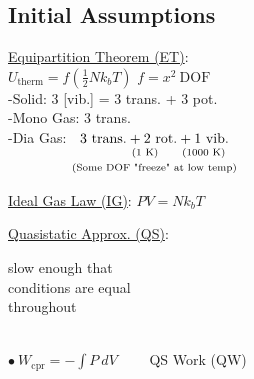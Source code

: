 \documentclass[12pt]{article}
\begin{document}
\subsection{Initial Assumptions}
\noindent
\begin{minipage}[t]{.49\textwidth}
    \underline{Equipartition Theorem (ET)}: \\[10pt]
    \(\boxed{ U_\text{therm} = f \left( \tfrac{1}{2} N k_b T \right) }\) 
        \hspace{20pt}\(\scriptstyle f = x^2\ \text{DOF}\) \\[10pt]
    -Solid: 3 [vib.] = 3 trans. + 3 pot. \\
    -Mono Gas: 3 trans.\\
    -Dia Gas: \(\begin{gathered}[t]
            \begin{aligned}[t]
                    &\text{3 trans.} + \text{2 rot.} + \text{1 vib.}\\[-6pt]
                    &\hspace{37pt} \text{\scriptsize(1 K)} \hspace{17pt} \text{\scriptsize(1000 K)} 
                \end{aligned}\\[-5pt]
            \text{\scriptsize(Some DOF "freeze" at low temp)}
        \end{gathered}\)
\end{minipage}
\begin{minipage}[t]{.49\textwidth}
    \underline{Ideal Gas Law (IG)}: \hspace{5pt} \(\boxed{ PV = N k_b T }\)

    \vspace{20pt}\noindent
    \underline{Quasistatic Approx. (QS)}: \hspace{5pt} \begin{minipage}{3cm}
            \scriptsize 
            slow enough that \\ conditions are equal \\ throughout
        \end{minipage}\\[10pt]
    \(\bullet\ \boxed{ W_\text{cpr} = - \int P\ dV }\) \ \ \ \ QS Work (QW)
\end{minipage}
\end{document}
